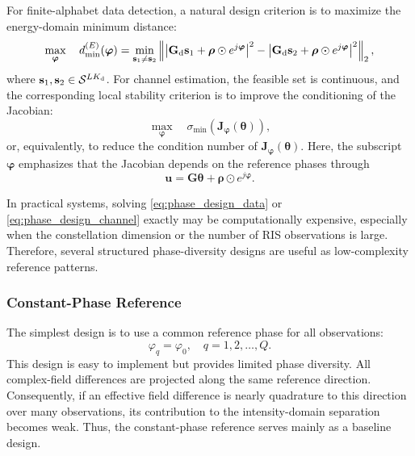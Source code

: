\documentclass[journal]{IEEEtran}
\begin{document}
For finite-alphabet data detection, a natural design criterion is to maximize the energy-domain minimum distance:
\begin{equation}
\max_{\boldsymbol{\varphi}}
\quad
d_{\min}^{(E)}(\boldsymbol{\varphi})
=
\min_{\mathbf{s}_1\neq\mathbf{s}_2}
\left\|
\left|
\mathbf{G}_{\rm d}\mathbf{s}_1+
\boldsymbol{\rho}\odot e^{j\boldsymbol{\varphi}}
\right|^2
-
\left|
\mathbf{G}_{\rm d}\mathbf{s}_2+
\boldsymbol{\rho}\odot e^{j\boldsymbol{\varphi}}
\right|^2
\right\|_2,
\label{eq:phase_design_data}
\end{equation}
where $\mathbf{s}_1,\mathbf{s}_2\in\mathcal{S}^{LK_{\rm d}}$. 
For channel estimation, the feasible set is continuous, and the corresponding local stability criterion is to improve the conditioning of the Jacobian:
\begin{equation}
\max_{\boldsymbol{\varphi}}
\quad
\sigma_{\min}
\left(
\mathbf{J}_{\boldsymbol{\varphi}}(\boldsymbol{\theta})
\right),
\label{eq:phase_design_channel}
\end{equation}
or, equivalently, to reduce the condition number of $\mathbf{J}_{\boldsymbol{\varphi}}(\boldsymbol{\theta})$. 
Here, the subscript $\boldsymbol{\varphi}$ emphasizes that the Jacobian depends on the reference phases through
\begin{equation}
\mathbf{u}
=
\mathbf{G}\boldsymbol{\theta}
+
\boldsymbol{\rho}\odot e^{j\boldsymbol{\varphi}}.
\end{equation}

In practical systems, solving \eqref{eq:phase_design_data} or \eqref{eq:phase_design_channel} exactly may be computationally expensive, especially when the constellation dimension or the number of RIS observations is large. 
Therefore, several structured phase-diversity designs are useful as low-complexity reference patterns.

\subsubsection{Constant-Phase Reference}

The simplest design is to use a common reference phase for all observations:
\begin{equation}
\varphi_q=\varphi_0,
\quad
q=1,2,\ldots,Q.
\label{eq:constant_phase_reference}
\end{equation}
This design is easy to implement but provides limited phase diversity. 
All complex-field differences are projected along the same reference direction. 
Consequently, if an effective field difference is nearly quadrature to this direction over many observations, its contribution to the intensity-domain separation becomes weak. 
Thus, the constant-phase reference serves mainly as a baseline design.
\end{document}
